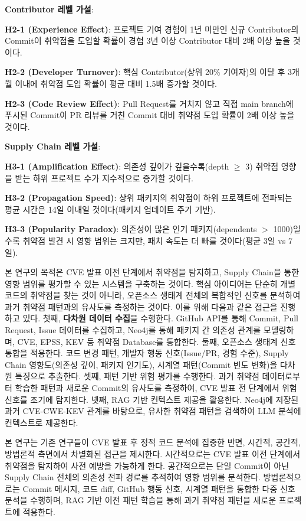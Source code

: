 ﻿\documentclass[conference]{IEEEtran}
\begin{document}
\noindent\textbf{Contributor 레벨 가설}:

\noindent\textbf{H2-1 (Experience Effect)}: 프로젝트 기여 경험이 1년 미만인 신규 Contributor의 Commit이 취약점을 도입할 확률이 경험 3년 이상 Contributor 대비 2배 이상 높을 것이다.

\noindent\textbf{H2-2 (Developer Turnover)}: 핵심 Contributor(상위 20\% 기여자)의 이탈 후 3개월 이내에 취약점 도입 확률이 평균 대비 1.5배 증가할 것이다.

\noindent\textbf{H2-3 (Code Review Effect)}: Pull Request를 거치지 않고 직접 main branch에 푸시된 Commit이 PR 리뷰를 거친 Commit 대비 취약점 도입 확률이 2배 이상 높을 것이다.

\noindent\textbf{Supply Chain 레벨 가설}:

\noindent\textbf{H3-1 (Amplification Effect)}: 의존성 깊이가 깊을수록(depth $\geq$ 3) 취약점 영향을 받는 하위 프로젝트 수가 지수적으로 증가할 것이다.

\noindent\textbf{H3-2 (Propagation Speed)}: 상위 패키지의 취약점이 하위 프로젝트에 전파되는 평균 시간은 14일 이내일 것이다(패키지 업데이트 주기 기반).

\noindent\textbf{H3-3 (Popularity Paradox)}: 의존성이 많은 인기 패키지(dependents $>$ 1000)일수록 취약점 발견 시 영향 범위는 크지만, 패치 속도는 더 빠를 것이다(평균 3일 vs 7일).

\noindent\indent 본 연구의 목적은 CVE 발표 이전 단계에서 취약점을 탐지하고, Supply Chain을 통한 영향 범위를 평가할 수 있는 시스템을 구축하는 것이다. 핵심 아이디어는 단순히 개별 코드의 취약점을 찾는 것이 아니라, 오픈소스 생태계 전체의 복합적인 신호를 분석하여 과거 취약점 패턴과의 유사도를 측정하는 것이다. 이를 위해 다음과 같은 접근을 진행하고 있다. 첫째, \textbf{다차원 데이터 수집}을 수행한다. GitHub API를 통해 Commit, Pull Request, Issue 데이터를 수집하고, Neo4j를 통해 패키지 간 의존성 관계를 모델링하며, CVE, EPSS, KEV 등 취약점 Database를 통합한다. 둘째, 오픈소스 생태계 신호 통합을 적용한다. 코드 변경 패턴, 개발자 행동 신호(Issue/PR, 경험 수준), Supply Chain 영향도(의존성 깊이, 패키지 인기도), 시계열 패턴(Commit 빈도 변화)을 다차원 특징으로 추출한다. 셋째, 패턴 기반 위험 평가를 수행한다. 과거 취약점 데이터로부터 학습한 패턴과 새로운 Commit의 유사도를 측정하여, CVE 발표 전 단계에서 위험 신호를 조기에 탐지한다. 넷째, RAG 기반 컨텍스트 제공을 활용한다. Neo4j에 저장된 과거 CVE-CWE-KEV 관계를 바탕으로, 유사한 취약점 패턴을 검색하여 LLM 분석에 컨텍스트로 제공한다.

본 연구는 기존 연구들이 CVE 발표 후 정적 코드 분석에 집중한 반면, 시간적, 공간적, 방법론적 측면에서 차별화된 접근을 제시한다. 시간적으로는 CVE 발표 이전 단계에서 취약점을 탐지하여 사전 예방을 가능하게 한다. 공간적으로는 단일 Commit이 아닌 Supply Chain 전체의 의존성 전파 경로를 추적하여 영향 범위를 분석한다. 방법론적으로는 Commit 메시지, 코드 diff, GitHub 행동 신호, 시계열 패턴을 통합한 다중 신호 분석을 수행하며, RAG 기반 이전 패턴 학습을 통해 과거 취약점 패턴을 새로운 프로젝트에 적용한다.
\end{document}
